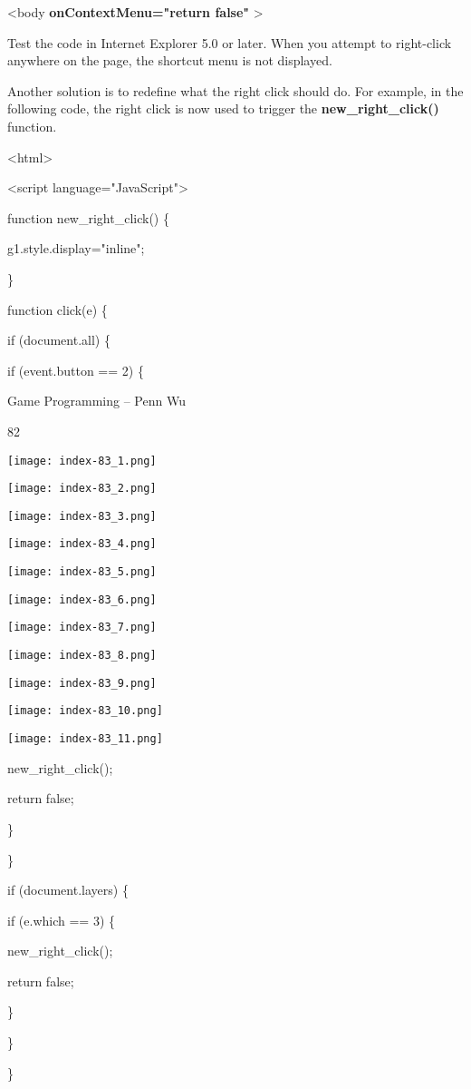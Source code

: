 \documentclass[
]{article}
\begin{document}
\textless body \textbf{onContextMenu="return false"} \textgreater{}

Test the code in Internet Explorer 5.0 or later. When you attempt to
right-click anywhere on the page, the shortcut menu is not displayed.

Another solution is to redefine what the right click should do. For
example, in the following code, the right click is now used to trigger
the \textbf{new\_right\_click()} function.

\textless html\textgreater{}

\textless script language="JavaScript"\textgreater{}

function new\_right\_click() \{

g1.style.display="inline";

\}

function click(e) \{

if (document.all) \{

if (event.button == 2) \{

Game Programming -- Penn Wu

82

\protect\hypertarget{index_split_006.htmlux5cux23p83}{}{}\texttt{[image: index-83\_1.png]}

\texttt{[image: index-83\_2.png]}

\texttt{[image: index-83\_3.png]}

\texttt{[image: index-83\_4.png]}

\texttt{[image: index-83\_5.png]}

\texttt{[image: index-83\_6.png]}

\texttt{[image: index-83\_7.png]}

\texttt{[image: index-83\_8.png]}

\texttt{[image: index-83\_9.png]}

\texttt{[image: index-83\_10.png]}

\texttt{[image: index-83\_11.png]}

new\_right\_click();

return false;

\}

\}

if (document.layers) \{

if (e.which == 3) \{

new\_right\_click();

return false;

\}

\}

\}
\end{document}
